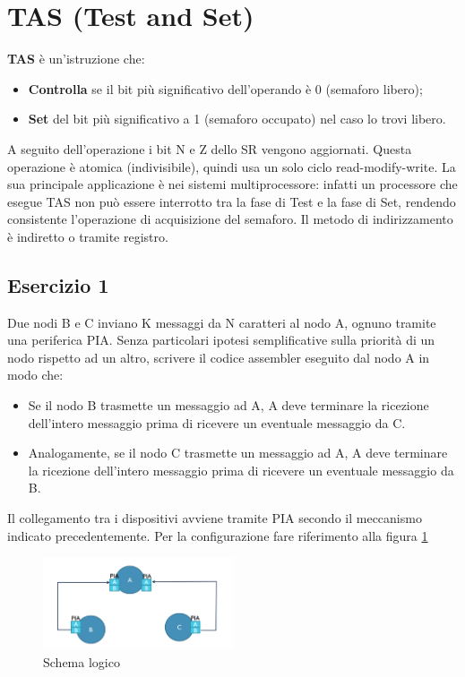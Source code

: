 \section{TAS (Test and Set)}

\textbf{TAS} è un'istruzione che:
\begin{itemize}
    \item \textbf{Controlla} se il bit più significativo dell'operando è 0 (semaforo libero);
    \item \textbf{Set} del bit più significativo a 1 (semaforo occupato) nel caso lo trovi libero. 
\end{itemize}

A seguito dell'operazione i bit N e Z dello SR vengono aggiornati. Questa operazione è atomica (indivisibile), quindi usa un solo ciclo read-modify-write. La sua principale applicazione è nei sistemi multiprocessore: infatti un processore che esegue TAS non può essere interrotto tra la fase di Test e la fase di Set, rendendo consistente l'operazione di acquisizione del semaforo. 
Il metodo di indirizzamento è indiretto o tramite registro. 

\subsection{Esercizio 1} \label{par:esercizio_2_1}
Due nodi B e C inviano K messaggi da N caratteri al nodo A, ognuno tramite una periferica PIA. Senza particolari ipotesi semplificative sulla priorità di un nodo rispetto ad un altro, scrivere il codice assembler eseguito dal nodo A in modo che:

\begin{itemize}
    \item Se il nodo B trasmette un messaggio ad A, A deve terminare la ricezione dell'intero messaggio prima di ricevere un eventuale messaggio da C.
    \item Analogamente, se il nodo C trasmette un messaggio ad A, A deve terminare la ricezione dell'intero messaggio prima di ricevere un eventuale messaggio da B. 
\end{itemize}

Il collegamento tra i dispositivi avviene tramite PIA secondo il meccanismo indicato precedentemente. Per la configurazione fare riferimento alla figura \ref{img:TAS_1}

\begin{figure} [!ht]
    \centering
    \includegraphics[width=0.5\textwidth]{img/TAS_1.png}
    \caption{Schema logico}\label{img:TAS_1}
\end{figure}

